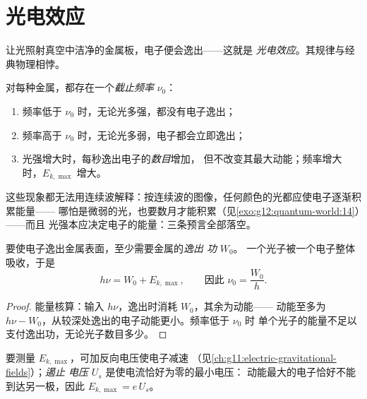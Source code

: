 \section{光电效应}

让光照射真空中洁净的金属板，电子便会逸出——这就是
\emph{光电效应}。其规律与经典物理相悖。

\begin{proposition}[实验揭示的事实]\label{prop:g12:quantum-world:facts}
对每种金属，都存在一个\emph{截止频率} $\nu_0$：
\begin{enumerate}
  \item 频率低于 $\nu_0$ 时，无论光多强，都没有电子逸出；
  \item 频率高于 $\nu_0$ 时，无论光多弱，电子都会立即逸出；
  \item 光强增大时，每秒逸出电子的\emph{数目}增加，
        但不改变其最大动能；频率增大时，$E_{k,\max}$ 增大。
\end{enumerate}
这些现象都无法用连续波解释：按连续波的图像，任何颜色的光都应使电子逐渐积累能量——
哪怕是微弱的光，也要数月才能积累（见\cref{exo:g12:quantum-world:14}）——而且
光强本应决定电子的能量：三条预言全部落空。
\end{proposition}
\admitted

\begin{theorem}[爱因斯坦光电效应方程]\label{thm:g12:quantum-world:einstein}
要使电子逸出金属表面，至少需要金属的\emph{逸出
功} $W_0$。
一个光子被一个电子整体吸收，于是
\[
h\nu = W_0 + E_{k,\max}, \qquad \text{因此 } \nu_0 = \frac{W_0}{h}.
\]
\end{theorem}

\begin{proof}
能量核算：输入 $h\nu$，逸出时消耗 $W_0$，其余为动能——
动能至多为 $h\nu - W_0$，从较深处逸出的电子动能更小。频率低于 $\nu_0$ 时
单个光子的能量不足以支付逸出功，无论光子数目多少。
\end{proof}

\begin{definition}[遏止电压]\label{def:g12:quantum-world:stopping}
要测量 $E_{k,\max}$，可加反向电压使电子减速
（见\cref{ch:g11:electric-gravitational-fields}）；\emph{遏止
电压} $U_s$ 是使电流恰好为零的最小电压：
动能最大的电子恰好不能到达另一极，因此 $E_{k,\max} = e\,U_s$。
\end{definition}

